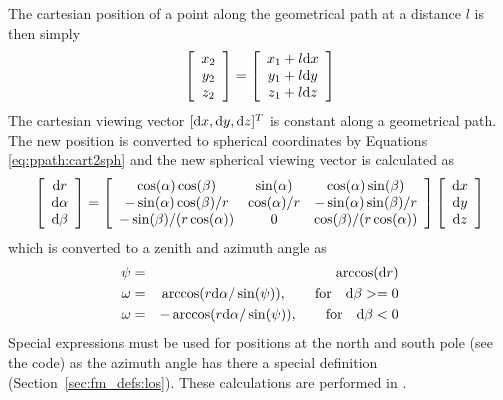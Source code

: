 The cartesian position of a point along the geometrical path at a
distance $l$ is then simply
\begin{equation}
 \left[ \begin{array}{c}
  x_2 \\
  y_2 \\
  z_2
 \end{array} \right] =
 \left[ \begin{array}{c}
  x_1 + l\mathrm{d} x \\
  y_1 + l\mathrm{d} y \\
  z_1 + l\mathrm{d} z
 \end{array} \right]
  \label{eq:ppath:xdl}
\end{equation}
The cartesian viewing vector $[\mathrm{d} x, \mathrm{d} y, \mathrm{d} z]^T$ is
constant along a geometrical path. The new position is
converted to spherical coordinates by Equations
\ref{eq:ppath:cart2sph} and the new spherical viewing vector is
calculated as
\begin{equation}
 \left[ \begin{array}{c}
  \mathrm{d} r \\
  \mathrm{d} \alpha \\
  \mathrm{d} \beta
 \end{array} \right] =
 \left[ \begin{array}{ccc}
  \cos(\alpha)\cos(\beta) & \sin(\alpha)            & \cos(\alpha)\sin(\beta) \\ 
  -\sin(\alpha)\cos(\beta)/r & \cos(\alpha)/r & -\sin(\alpha)\sin(\beta)/r \\ 
  -\sin(\beta)/(r\cos(\alpha)) & 0             & \cos(\beta)/(r\cos(\alpha)) 
 \end{array} \right] 
 \left[ \begin{array}{c}
  \mathrm{d} x \\
  \mathrm{d} y \\
  \mathrm{d} z
 \end{array} \right]
 \label{eq:ppath:los2sph}
\end{equation}
which is converted to a zenith and azimuth angle as
\begin{eqnarray}
  \psi &=& \arccos(\mathrm{d} r) \nonumber  \\
  \omega &=& \arccos(r\mathrm{d}\alpha/\sin(\psi)), 
                      \qquad \textrm{for} \quad \mathrm{d}\beta >= 0 \\
  \omega &=& -\arccos(r\mathrm{d}\alpha/\sin(\psi)), 
                      \qquad \textrm{for} \quad \mathrm{d}\beta < 0  \nonumber
 \label{eq:ppath:conv2zaaa}
\end{eqnarray}
Special expressions must be used for positions at the north and south
pole (see the code) as the azimuth angle has there a special
definition (Section~\ref{sec:fm_defs:los}). These calculations are performed in
.

